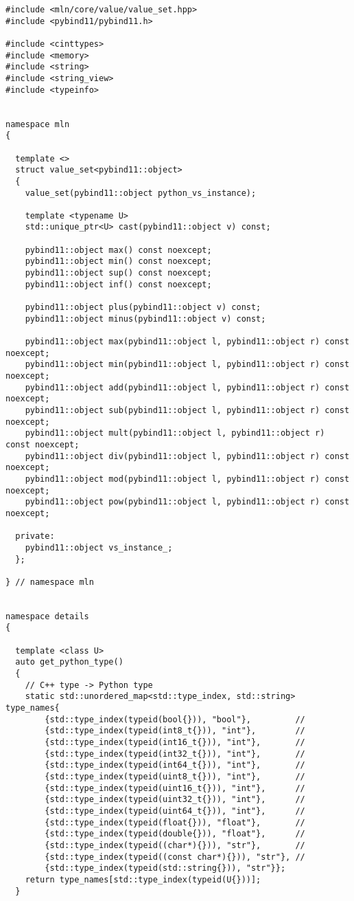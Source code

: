 \begin{verbatim}
#include <mln/core/value/value_set.hpp>
#include <pybind11/pybind11.h>

#include <cinttypes>
#include <memory>
#include <string>
#include <string_view>
#include <typeinfo>


namespace mln
{

  template <>
  struct value_set<pybind11::object>
  {
    value_set(pybind11::object python_vs_instance);

    template <typename U>
    std::unique_ptr<U> cast(pybind11::object v) const;

    pybind11::object max() const noexcept;
    pybind11::object min() const noexcept;
    pybind11::object sup() const noexcept;
    pybind11::object inf() const noexcept;

    pybind11::object plus(pybind11::object v) const;
    pybind11::object minus(pybind11::object v) const;

    pybind11::object max(pybind11::object l, pybind11::object r) const noexcept;
    pybind11::object min(pybind11::object l, pybind11::object r) const noexcept;
    pybind11::object add(pybind11::object l, pybind11::object r) const noexcept;
    pybind11::object sub(pybind11::object l, pybind11::object r) const noexcept;
    pybind11::object mult(pybind11::object l, pybind11::object r) const noexcept;
    pybind11::object div(pybind11::object l, pybind11::object r) const noexcept;
    pybind11::object mod(pybind11::object l, pybind11::object r) const noexcept;
    pybind11::object pow(pybind11::object l, pybind11::object r) const noexcept;

  private:
    pybind11::object vs_instance_;
  };

} // namespace mln


namespace details
{

  template <class U>
  auto get_python_type()
  {
    // C++ type -> Python type
    static std::unordered_map<std::type_index, std::string> type_names{
        {std::type_index(typeid(bool{})), "bool"},         //
        {std::type_index(typeid(int8_t{})), "int"},        //
        {std::type_index(typeid(int16_t{})), "int"},       //
        {std::type_index(typeid(int32_t{})), "int"},       //
        {std::type_index(typeid(int64_t{})), "int"},       //
        {std::type_index(typeid(uint8_t{})), "int"},       //
        {std::type_index(typeid(uint16_t{})), "int"},      //
        {std::type_index(typeid(uint32_t{})), "int"},      //
        {std::type_index(typeid(uint64_t{})), "int"},      //
        {std::type_index(typeid(float{})), "float"},       //
        {std::type_index(typeid(double{})), "float"},      //
        {std::type_index(typeid((char*){})), "str"},       //
        {std::type_index(typeid((const char*){})), "str"}, //
        {std::type_index(typeid(std::string{})), "str"}};
    return type_names[std::type_index(typeid(U{}))];
  }


\end{verbatim}
